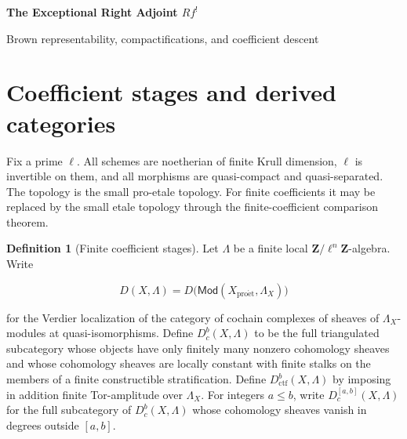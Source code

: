 \documentclass[10pt]{article}
\theoremstyle{definition}
\newtheorem{definition}[theorem]{Definition}
\newcommand{\Dbc}{D^b_c}
\newcommand{\Dctf}{D^b_{\mathrm{ctf}}}
\begin{document}
\begin{center}
{\large\bfseries The Exceptional Right Adjoint \(Rf^!\)\par}
\medskip
{\normalsize Brown representability, compactifications, and coefficient descent\par}
\end{center}

\begin{abstract}
Let \(f:X\to Y\) be a separated morphism of finite type.  This note specifies
the ordinary triangulated categories on which \(Rf_!\) and its exceptional
right adjoint are defined.  It separates the representability input from the
construction of the adjunction, records the compactification formula and its
mates, and gives the comparison theorems needed for composition and change of
coefficients.  Every restricted functor is preceded by a preservation
statement.
\end{abstract}

\tableofcontents

\section{Coefficient stages and derived categories}

Fix a prime \(\ell\).  All schemes are noetherian of finite Krull dimension,
\(\ell\) is invertible on them, and all morphisms are quasi-compact and
quasi-separated.  The topology is the small pro-etale topology.  For finite
coefficients it may be replaced by the small etale topology through the
finite-coefficient comparison theorem.

\begin{definition}[Finite coefficient stages]
Let \(\Lambda\) be a finite local \(\mathbf Z/\ell^n\mathbf Z\)-algebra.  Write

\[
 D(X,\Lambda)=D\bigl(\mathsf{Mod}(X_{\mathrm{pro\acute et}},\Lambda_X)\bigr)
\]

for the Verdier localization of the category of cochain complexes of sheaves
of \(\Lambda_X\)-modules at quasi-isomorphisms.  Define
\(\Dbc(X,\Lambda)\) to be the full triangulated subcategory whose objects have
only finitely many nonzero cohomology sheaves and whose cohomology sheaves are
locally constant with finite stalks on the members of a finite constructible
stratification.  Define \(\Dctf(X,\Lambda)\) by imposing in addition finite
Tor-amplitude over \(\Lambda_X\).
For integers \(a\leq b\), write \(D^{[a,b]}_c(X,\Lambda)\) for the full
subcategory of \(\Dbc(X,\Lambda)\) whose cohomology sheaves vanish in
degrees outside \([a,b]\).
\end{definition}
\end{document}
